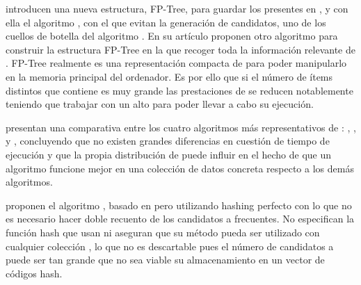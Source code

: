 \citet{HanPeiYin-MiningFrequentPatternsWithoutCandidateGeneration-2000} introducen una nueva estructura, {FP-Tree}, para guardar los \itemsets presentes en \D, y con ella el algoritmo %
, con el que evitan la generación de candidatos, uno de los cuellos de botella del algoritmo \apriori. En su artículo proponen otro algoritmo para construir la estructura {FP-Tree} en la que recoger toda la información relevante de \D. {FP-Tree} realmente es una representación compacta de \D para poder manipularlo en la memoria principal del ordenador. Es por ello que si el número de ítems distintos que contiene es muy grande las prestaciones de  se reducen notablemente teniendo que trabajar con un \soporte alto para poder llevar a cabo su ejecución.%
% 
% 
% 


\citet{HippGuntzerNakhaeizadeh-AlgorithmsForAssociationRuleMining-2000} presentan una comparativa entre los cuatro algoritmos más representativos de \ARM: , ,  y , concluyendo que no existen grandes diferencias en cuestión de tiempo de ejecución y que la propia distribución de \D puede influir en el hecho de que un algoritmo funcione mejor en una colección de datos concreta respecto a los demás algoritmos.


\citet{OzelGuvenir-AnAlgorithmForMining-2001} proponen el algoritmo , basado en  pero utilizando hashing perfecto con lo que no es necesario hacer doble recuento de los candidatos a \kitemsets[(k+1)] frecuentes. No especifican la función hash que usan ni aseguran que su método pueda ser utilizado con cualquier colección \D, lo que no es descartable pues el número de candidatos a \kitemsets[(k+1)] puede ser tan grande que no sea viable su almacenamiento en un vector de códigos hash.

